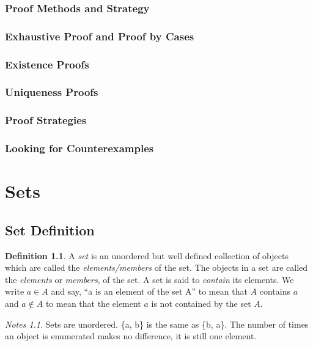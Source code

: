 \documentclass[11pt]{book} %
\theoremstyle {definition}
\newtheorem {definition}{Definition}[section]
\theoremstyle {remark}
\newtheorem*{notes}{Notes}
\begin{document}
\subsection {Proof Methods and Strategy}
  \subsection {Exhaustive Proof and Proof by Cases}
  \subsection {Existence Proofs}
  \subsection {Uniqueness Proofs}
  \subsection {Proof Strategies}
  \subsection {Looking for Counterexamples}




\chapter {Sets}

\section {Set Definition}

\begin {definition}
A \textit{set} is an unordered but well defined collection of objects which are called the \textit{elements/members} of the set.  The objects in a set are called the \textit{elements} or \textit{members}, of the set. A set is said to \textit{contain} its elements. We write $a \in A$ and say, ``a is an element of the set A'' to mean that $A$ contains $a$ and $a \notin A$ to mean that the element $a$ is not contained by the set $A$.
\end {definition}

\begin{notes}
   Sets are unordered. \{a, b\} is the same as \{b, a\}. The number of times an object is enumerated makes no difference, it is still one element.
\end{notes}
\end{document}
